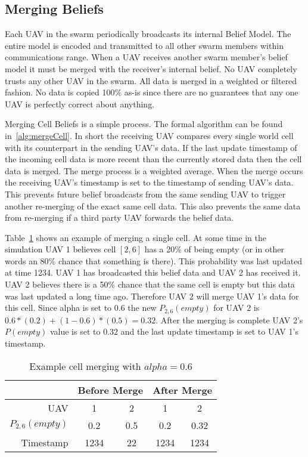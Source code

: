 \subsection{Merging Beliefs}
Each UAV in the swarm periodically broadcasts its internal Belief Model.  The entire model is encoded and transmitted to all other swarm members within communications range.  When a UAV receives another swarm member's belief model it must be merged with the receiver's internal belief.  No UAV completely trusts any other UAV in the swarm.  All data is merged in a weighted or filtered fashion.  No data is copied 100\% as-is since there are no guarantees that any one UAV is perfectly correct about anything.

Merging Cell Beliefs is a simple process.  The formal algorithm can be found in~\ref{alg:mergeCell}.  In short the receiving UAV compares every single world cell with its counterpart in the sending UAV's data.  If the last update timestamp of the incoming cell data is more recent than the currently stored data then the cell data is merged.  The merge process is a weighted average.  When the merge occurs the receiving UAV's timestamp is set to the timestamp of sending UAV's data.  This prevents future belief broadcasts from the same sending UAV to trigger another re-merging of the exact same cell data.  This also prevents the same data from re-merging if a third party UAV forwards the belief data. 

Table~\ref{tab:exampleCellMerge} shows an example of merging a single cell.  At some time in the simulation UAV 1 believes cell $[2, 6]$ has a 20\% of being empty (or in other words an 80\% chance that something is there). This probability was last updated at time 1234.  UAV 1 has broadcasted this belief data and UAV 2 has received it.  UAV 2 believes there is a 50\% chance that the same cell is empty but this data was last updated a long time ago.  Therefore UAV 2 will merge UAV 1's data for this cell.  Since alpha is set to 0.6 the new $P_{2,6}(empty)$ for UAV 2 is $0.6*(0.2) + (1-0.6)*(0.5)=0.32$.  After the merging is complete UAV 2's $P(empty)$ value is set to $0.32$ and the last update timestamp is set to UAV 1's timestamp.

\begin{table}[h]
	\caption{Example cell merging with $alpha=0.6$}
	\centering
	\label{tab:exampleCellMerge}
	\begin{tabular}{|r|c|c||c|c|}
		\hline
		                & \multicolumn{2}{c||}{Before Merge} & \multicolumn{2}{c|}{After Merge} \\
		\hline
		UAV             & 1   & 2                            & 1   & 2 \\
		\hline
		$P_{2,6}(empty)$& 0.2 & 0.5                          & 0.2 & 0.32 \\
		\hline
		Timestamp       & 1234& 22                           & 1234& 1234 \\
		\hline
	\end{tabular}
\end{table}

